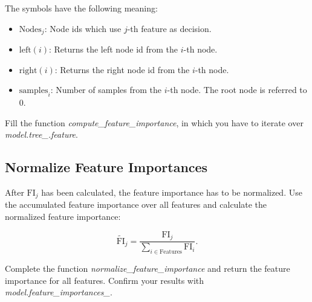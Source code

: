 \documentclass[a4paper]{article}
\begin{document}
\noindent The symbols have the following meaning:

\begin{itemize}
    \item $\mathrm{Nodes}_j$: Node ids which use $j$-th feature as decision. \
    \item $\mathrm{left}(i)$: Returns the left node id from the $i$-th node. \
    \item $\mathrm{right}(i)$: Returns the right node id from the $i$-th node. \
    \item $\mathrm{samples}_i$: Number of samples from the $i$-th node. The root node is referred to 0.
\end{itemize}

\noindent Fill the function \textit{compute\_feature\_importance}, in which you have to iterate over \textit{model.tree\_.feature}.

\subsection{Normalize Feature Importances}

After $\mathrm{FI}_j$ has been calculated, the feature importance has to be normalized. Use the accumulated feature importance over all features and calculate the normalized feature importance:

\begin{equation}
\widetilde{\mathrm{FI}}_j = \dfrac
{
    \mathrm{FI}_j
}
{
    \sum_{i \in \mathrm{Features}}{\mathrm{FI}_i}
}.
\end{equation}

\noindent Complete the function \textit{normalize\_feature\_importance} and return the feature importance for all features.
Confirm your results with \textit{model.feature\_importances\_}.
\end{document}
